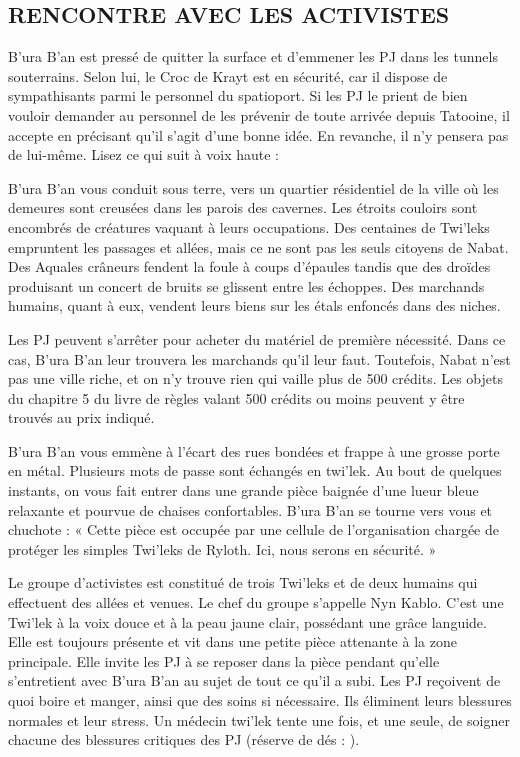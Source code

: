\documentclass[a4paper,10pt,twoside,twocolumn,openany]{book}
\begin{document}
\subsection{RENCONTRE AVEC LES ACTIVISTES}

B’ura B’an est pressé de quitter la surface et d’emmener les PJ dans les tunnels souterrains. Selon lui, le Croc
de Krayt est en sécurité, car il dispose de sympathisants
parmi le personnel du spatioport. Si les PJ le prient de
bien vouloir demander au personnel de les prévenir de
toute arrivée depuis Tatooine, il accepte en précisant
qu’il s’agit d’une bonne idée. En revanche, il n’y pensera
pas de lui-même. Lisez ce qui suit à voix haute :

\begin{quotebox}
    
B’ura B’an vous conduit sous terre, vers un quartier résidentiel de la ville où les demeures sont
creusées dans les parois des cavernes. Les étroits
couloirs sont encombrés de créatures vaquant à
leurs occupations. Des centaines de Twi’leks empruntent les passages et allées, mais ce ne sont
pas les seuls citoyens de Nabat. Des Aquales
crâneurs fendent la foule à coups d’épaules tandis
que des droïdes produisant un concert de bruits
se glissent entre les échoppes. Des marchands
humains, quant à eux, vendent leurs biens sur les
étals enfoncés dans des niches.\end{quotebox}

Les PJ peuvent s’arrêter pour acheter du matériel de
première nécessité. Dans ce cas, B’ura B’an leur trouvera les marchands qu’il leur faut. Toutefois, Nabat n’est
pas une ville riche, et on n’y trouve rien qui vaille plus de
500 crédits. Les objets du chapitre 5 du livre de règles
valant 500 crédits ou moins peuvent y être trouvés au
prix indiqué.

\begin{quotebox}
    
B’ura B’an vous emmène à l’écart des rues bondées et frappe à une grosse porte en métal. Plusieurs mots de passe sont échangés en twi’lek. Au
bout de quelques instants, on vous fait entrer dans
une grande pièce baignée d’une lueur bleue relaxante et pourvue de chaises confortables. B’ura
B’an se tourne vers vous et chuchote : « Cette
pièce est occupée par une cellule de l’organisation chargée de protéger les simples Twi’leks de
Ryloth. Ici, nous serons en sécurité. »\end{quotebox}

Le groupe d’activistes est constitué de trois Twi’leks
et de deux humains qui effectuent des allées et venues.
Le chef du groupe s’appelle Nyn Kablo. C’est une Twi’lek
à la voix douce et à la peau jaune clair, possédant une
grâce languide. Elle est toujours présente et vit dans une
petite pièce attenante à la zone principale. Elle invite les
PJ à se reposer dans la pièce pendant qu’elle s’entretient
avec B’ura B’an au sujet de tout ce qu’il a subi. Les PJ
reçoivent de quoi boire et manger, ainsi que des soins si
nécessaire. Ils éliminent leurs blessures normales et leur
stress. Un médecin twi’lek tente une fois, et une seule, de
soigner chacune des blessures critiques des PJ (réserve
de dés : \difficulty \difficulty \proficiency).
\end{document}
